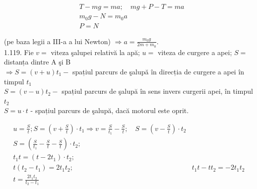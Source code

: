\documentclass[10pt]{article}
\begin{document}
$$
\begin{aligned}
& T-m g=m a ; \quad m g+P-T=m a \\
& m_{0} g-N=m_{0} a \\
& P=N
\end{aligned}
$$

(pe baza legii a III-a a lui Newton) $\Rightarrow a=\frac{m_{0} g}{2 m+m_{0}}$.\\
1.119. Fie $v=$ viteza şalupei relativă la apă; $u=$ viteza de curgere a apei; $S=$ distanța dintre A şi B\\
$\Rightarrow S=(v+u) t_{1}-$ spațiul parcurs de şalupă în direcția de curgere a apei în timpul $t_{1}$\\
$S=(v-u) t_{2}-$ spațiul parcurs de şalupă în sens invers curgerii apei, în timpul $t_{2}$\\
$S=u \cdot t$ - spațiul parcurs de şalupă, dacă motorul este oprit.

$$
\begin{array}{ll}
u=\frac{S}{t} ; S=\left(v+\frac{S}{t}\right) \cdot t_{1} \Rightarrow v=\frac{S}{t_{1}}-\frac{S}{t} ; \quad S=\left(v-\frac{S}{t}\right) \cdot t_{2} \\
S=\left(\frac{S}{t_{1}}-\frac{S}{t}-\frac{S}{t}\right) \cdot t_{2} ; \\
t_{1} t=\left(t-2 t_{1}\right) \cdot t_{2} ; \\
t\left(t_{2}-t_{1}\right)=2 t_{1} t_{2} ; & t_{1} t-t t_{2}=-2 t_{1} t_{2} \\
t=\frac{2 t_{1} t_{2}}{t_{2}-t_{1}}
\end{array}
$$
\end{document}
